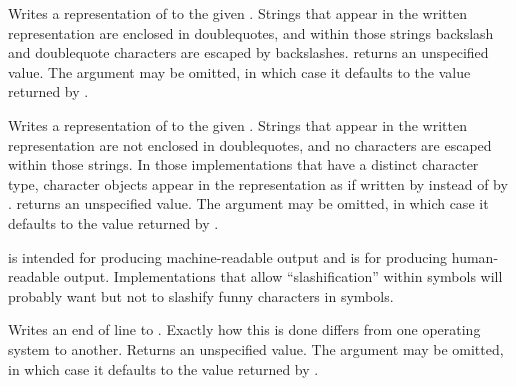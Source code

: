 \noindent \hbox{}
\vspace{-5ex}

\begin{entry}{%
}

Writes a representation of  to the given .  Strings that
appear in the written representation are enclosed in doublequotes, and
within those strings backslash and doublequote characters are
escaped by backslashes.   returns an unspecified value.  The
 argument may be omitted, in which case it defaults to the value
returned by .

\end{entry}


\begin{entry}{%
}

Writes a representation of  to the given .  Strings
that appear in the written representation are not enclosed in
doublequotes, and no characters are escaped within those strings.  In
those implementations that have a distinct character type, character
objects appear in the representation as if written by 
instead of by .   returns an unspecified value.
The  argument may be omitted, in which case it defaults to the
value returned by .

\begin{rationale}
 is intended
for producing mach\-ine-readable output and  is for producing
human-readable output.  Implementations that allow ``slashification''
within symbols will probably want  but not  to
slashify funny characters in symbols.
\end{rationale}
\end{entry}


\begin{entry}{%
}

Writes an end of line to .  Exactly how this is done differs
from one operating system to another.  Returns an unspecified value.
The  argument may be omitted, in which case it defaults to the
value returned by .

\end{entry}


